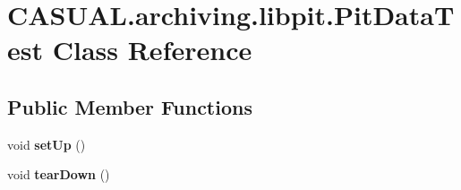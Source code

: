 \hypertarget{class_c_a_s_u_a_l_1_1archiving_1_1libpit_1_1_pit_data_test}{\section{C\-A\-S\-U\-A\-L.\-archiving.\-libpit.\-Pit\-Data\-Test Class Reference}
\label{class_c_a_s_u_a_l_1_1archiving_1_1libpit_1_1_pit_data_test}
}
\subsection*{Public Member Functions}
\begin{DoxyCompactItemize}
\item 
\hypertarget{class_c_a_s_u_a_l_1_1archiving_1_1libpit_1_1_pit_data_test_ab54388e623b45dfbe358c9b10366e045}{void {\bfseries set\-Up} ()}\label{class_c_a_s_u_a_l_1_1archiving_1_1libpit_1_1_pit_data_test_ab54388e623b45dfbe358c9b10366e045}

\item 
\hypertarget{class_c_a_s_u_a_l_1_1archiving_1_1libpit_1_1_pit_data_test_a6aa879dd9e6337e24cdd1d0a745dc33c}{void {\bfseries tear\-Down} ()}\label{class_c_a_s_u_a_l_1_1archiving_1_1libpit_1_1_pit_data_test_a6aa879dd9e6337e24cdd1d0a745dc33c}


\end{DoxyCompactItemize}
